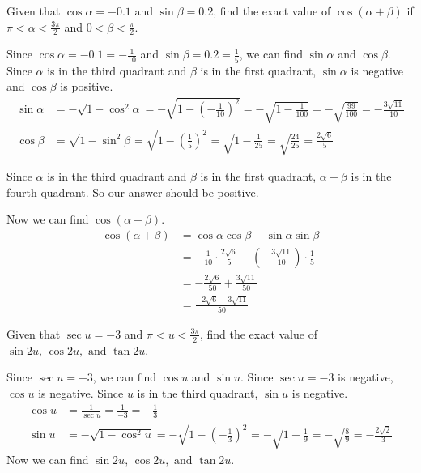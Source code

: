 \documentclass{exam}
\begin{document}
\begin{questions}
\newpage

\question Given that $\cos\alpha=-0.1$ and $\sin\beta=0.2$, find the exact value of $\cos(\alpha+\beta)$ if $\pi<\alpha<\frac{3\pi}{2}$ and $0<\beta<\frac{\pi}{2}$.
\begin{solution}
Since $\cos\alpha=-0.1=-\frac{1}{10}$ and $\sin\beta=0.2=\frac{1}{5}$, we can find $\sin\alpha$ and $\cos\beta$. Since $\alpha$ is in the third quadrant and $\beta$ is in the first quadrant, $\sin\alpha$ is negative and $\cos\beta$ is positive.
\begin{align*}
\sin\alpha&=-\sqrt{1-\cos^2\alpha}=-\sqrt{1-\left(-\frac{1}{10}\right)^2}=-\sqrt{1-\frac{1}{100}}=-\sqrt{\frac{99}{100}}=-\frac{3\sqrt{11}}{10}\\
\cos\beta&=\sqrt{1-\sin^2\beta}=\sqrt{1-\left(\frac{1}{5}\right)^2}=\sqrt{1-\frac{1}{25}}=\sqrt{\frac{24}{25}}=\frac{2\sqrt{6}}{5}
\end{align*}

Since $\alpha$ is in the third quadrant and $\beta$ is in the first quadrant, $\alpha+\beta$ is in the fourth quadrant. So our answer should be positive.

Now we can find $\cos(\alpha+\beta)$.
\begin{align*}
\cos(\alpha+\beta)&=\cos\alpha\cos\beta-\sin\alpha\sin\beta\\
&=-\frac{1}{10}\cdot\frac{2\sqrt{6}}{5}-\left(-\frac{3\sqrt{11}}{10}\right)\cdot\frac{1}{5}\\
&=-\frac{2\sqrt{6}}{50}+\frac{3\sqrt{11}}{50}\\
&=\frac{-2\sqrt{6}+3\sqrt{11}}{50}
\end{align*} 
\end{solution}

\question Given that $\sec u=-3$ and $\pi<u<\frac{3\pi}{2}$, find the exact value of $\sin2u,\,\cos2u,\text{ and }\tan2u$.
\begin{solution}
Since $\sec u=-3$, we can find $\cos u$ and $\sin u$. Since $\sec u=-3$ is negative, $\cos u$ is negative. Since $u$ is in the third quadrant, $\sin u$ is negative.
\begin{align*}
\cos u&=\frac{1}{\sec u}=\frac{1}{-3}=-\frac{1}{3}\\
\sin u&=-\sqrt{1-\cos^2 u}=-\sqrt{1-\left(-\frac{1}{3}\right)^2}=-\sqrt{1-\frac{1}{9}}=-\sqrt{\frac{8}{9}}=-\frac{2\sqrt{2}}{3}
\end{align*}
Now we can find $\sin2u,\,\cos2u,\text{ and }\tan2u$.


\end{solution}
\end{questions}
\end{document}
